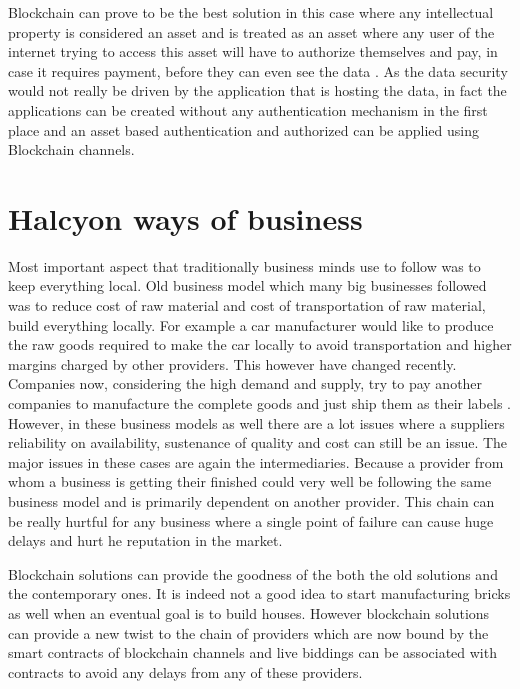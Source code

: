 Blockchain can prove to be the best solution in this case where any intellectual property is considered an asset and is treated as an asset where any user of the internet trying to access this asset will have to authorize themselves and pay, in case it requires payment, before they can even see the data \cite{bitcoinist29}. As the data security would not really be driven by the application that is hosting the data, in fact the applications can be created without any authentication mechanism in the first place and an asset based authentication and authorized can be applied using Blockchain channels.


\section{Halcyon ways of business}
Most important aspect that traditionally business minds use to follow was to keep everything local. Old business model which many big businesses followed was to reduce cost of raw material and cost of transportation of raw material, build everything locally. For example a car manufacturer would like to produce the raw goods required to make the car locally to avoid transportation and higher margins charged by other providers. This however have changed recently. Companies now, considering the high demand and supply, try to pay another companies to manufacture the complete goods and just ship them as their labels \cite{ewan30}. However, in these business models as well there are a lot issues where a suppliers reliability on availability, sustenance of quality and cost can still be an issue. The major issues in these cases are again the intermediaries. Because a provider from whom a business is getting their finished could very well be following the same business model and is primarily dependent on another provider. This chain can be really hurtful for any business where a single point of failure can cause huge delays and hurt he reputation in the market.

Blockchain solutions can provide the goodness of the both the old solutions and the contemporary ones. It is indeed not a good idea to start manufacturing bricks as well when an eventual goal is to build houses. However blockchain solutions can provide a new twist to the chain of providers which are now bound by the smart contracts of blockchain channels and live biddings can be associated with contracts to avoid any delays from any of these providers.

